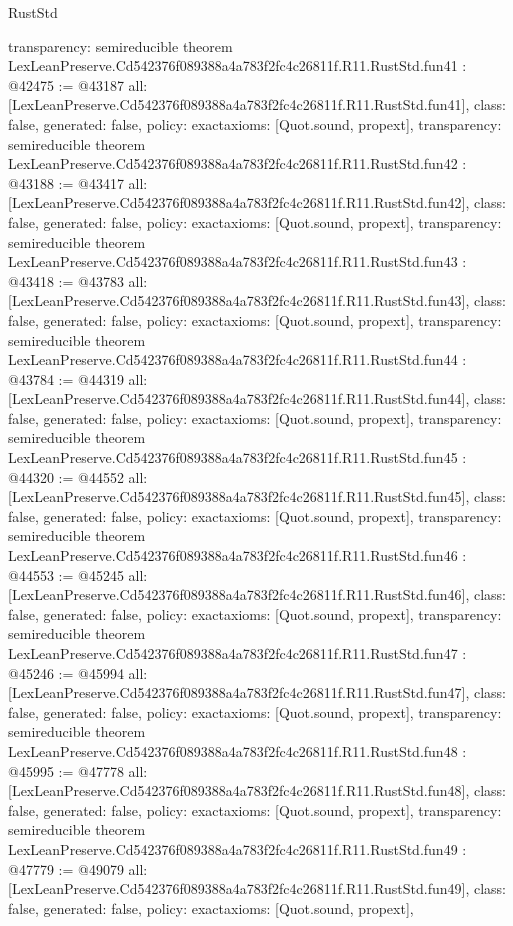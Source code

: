 \begin{lexlean}{RustStd}
\begin{coremodule}
{  transparency: semireducible
}
theorem LexLeanPreserve.Cd542376f089388a4a783f2fc4c26811f.R11.RustStd.fun41 : @42475 := @43187 {
  all: [LexLeanPreserve.Cd542376f089388a4a783f2fc4c26811f.R11.RustStd.fun41],
  class: false,
  generated: false,
  policy: exact{axioms: [Quot.sound, propext]},
  transparency: semireducible
}
theorem LexLeanPreserve.Cd542376f089388a4a783f2fc4c26811f.R11.RustStd.fun42 : @43188 := @43417 {
  all: [LexLeanPreserve.Cd542376f089388a4a783f2fc4c26811f.R11.RustStd.fun42],
  class: false,
  generated: false,
  policy: exact{axioms: [Quot.sound, propext]},
  transparency: semireducible
}
theorem LexLeanPreserve.Cd542376f089388a4a783f2fc4c26811f.R11.RustStd.fun43 : @43418 := @43783 {
  all: [LexLeanPreserve.Cd542376f089388a4a783f2fc4c26811f.R11.RustStd.fun43],
  class: false,
  generated: false,
  policy: exact{axioms: [Quot.sound, propext]},
  transparency: semireducible
}
theorem LexLeanPreserve.Cd542376f089388a4a783f2fc4c26811f.R11.RustStd.fun44 : @43784 := @44319 {
  all: [LexLeanPreserve.Cd542376f089388a4a783f2fc4c26811f.R11.RustStd.fun44],
  class: false,
  generated: false,
  policy: exact{axioms: [Quot.sound, propext]},
  transparency: semireducible
}
theorem LexLeanPreserve.Cd542376f089388a4a783f2fc4c26811f.R11.RustStd.fun45 : @44320 := @44552 {
  all: [LexLeanPreserve.Cd542376f089388a4a783f2fc4c26811f.R11.RustStd.fun45],
  class: false,
  generated: false,
  policy: exact{axioms: [Quot.sound, propext]},
  transparency: semireducible
}
theorem LexLeanPreserve.Cd542376f089388a4a783f2fc4c26811f.R11.RustStd.fun46 : @44553 := @45245 {
  all: [LexLeanPreserve.Cd542376f089388a4a783f2fc4c26811f.R11.RustStd.fun46],
  class: false,
  generated: false,
  policy: exact{axioms: [Quot.sound, propext]},
  transparency: semireducible
}
theorem LexLeanPreserve.Cd542376f089388a4a783f2fc4c26811f.R11.RustStd.fun47 : @45246 := @45994 {
  all: [LexLeanPreserve.Cd542376f089388a4a783f2fc4c26811f.R11.RustStd.fun47],
  class: false,
  generated: false,
  policy: exact{axioms: [Quot.sound, propext]},
  transparency: semireducible
}
theorem LexLeanPreserve.Cd542376f089388a4a783f2fc4c26811f.R11.RustStd.fun48 : @45995 := @47778 {
  all: [LexLeanPreserve.Cd542376f089388a4a783f2fc4c26811f.R11.RustStd.fun48],
  class: false,
  generated: false,
  policy: exact{axioms: [Quot.sound, propext]},
  transparency: semireducible
}
theorem LexLeanPreserve.Cd542376f089388a4a783f2fc4c26811f.R11.RustStd.fun49 : @47779 := @49079 {
  all: [LexLeanPreserve.Cd542376f089388a4a783f2fc4c26811f.R11.RustStd.fun49],
  class: false,
  generated: false,
  policy: exact{axioms: [Quot.sound, propext]},
}
\end{coremodule}
\end{lexlean}
